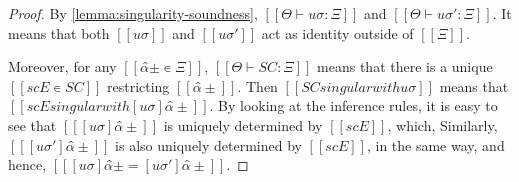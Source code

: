 \obsSingularityDeterministic*
\begin{proof}
    By \cref{lemma:singularity-soundness},
    $[[Θ ⊢ uσ : Ξ]]$ and $[[Θ ⊢ uσ' : Ξ]]$.
    It means that both $[[uσ]]$ and $[[uσ']]$
    act as identity outside of $[[Ξ]]$.

    Moreover, for any $[[α̂± ∊ Ξ]]$,
    $[[Θ ⊢ SC : Ξ]]$ means that 
    there is a unique $[[scE ∊ SC]]$ restricting $[[α̂±]]$.
    Then $[[SC singular with uσ]]$ means 
    that $[[scE singular with [uσ]α̂± ]]$.
    By looking at the inference rules, it is easy to see that
    $[[ [uσ]α̂± ]]$ is uniquely determined by $[[scE]]$, which, 
    Similarly, $[[ [uσ']α̂± ]]$ is also uniquely determined by $[[scE]]$,  
    in the same way, and hence, $[[ [uσ]α̂± = [uσ']α̂± ]]$.
\end{proof}


